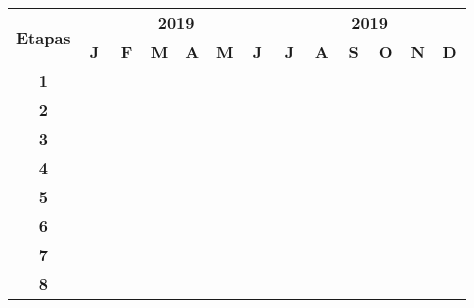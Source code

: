 \documentclass[11pt]{article}
\begin{document}
\begin{table}[h]
\centering
\begin{tabular}{|c||c|c|c|c|c|c|c|c|c|c|c|c||c|c|c|c|c|c|c|c|c|c|c|c|}
  \hline
  \multirow{2}{*}{\textbf{\small{Etapas}}} &
  \multicolumn{12}{|c||}{\textbf{\small{2019}}} &
  \multicolumn{12}{|c|}{\textbf{\small{2019}}} \\
  \cline{2-25}
   & \multicolumn{2}{|c|}{\textbf{J}} & \multicolumn{2}{|c|}{\textbf{F}} & \multicolumn{2}{|c|}{\textbf{M}} & \multicolumn{2}{|c|}{\textbf{A}} & \multicolumn{2}{|c|}{\textbf{M}} & \multicolumn{2}{|c||}{\textbf{J}} & \multicolumn{2}{|c|}{\textbf{J}} & \multicolumn{2}{|c|}{\textbf{A}} & \multicolumn{2}{|c|}{\textbf{S}} & \multicolumn{2}{|c|}{\textbf{O}} & \multicolumn{2}{|c|}{\textbf{N}} & \multicolumn{2}{|c|}{\textbf{D}}  \\
  \hline \hline
  \textbf{\small{1}} & & \cellcolor{black} & \cellcolor{black} & \cellcolor{black} & \cellcolor{black} & & & & & & & & & & & & & & & & & & & \\
  \hline
  \textbf{\small{2}} & & & \cellcolor{black} & \cellcolor{black} & \cellcolor{black} & \cellcolor{black} & & & & & & & & & & & & & & & & & & \\
  \hline
  \textbf{\small{3}} & & & & \cellcolor{black} & \cellcolor{black} & \cellcolor{black} & \cellcolor{black} & \cellcolor{black} & \cellcolor{black} & & & & & & & & & & & & & & & \\
  \hline
  \textbf{\small{4}} & & & & & & & & & & \cellcolor{black} & \cellcolor{black} & \cellcolor{black} & \cellcolor{black} & \cellcolor{black} & \cellcolor{black} & & & & & & & & & \\
  \hline
  \textbf{\small{5}} & & & & & & & & & & & & & & & \cellcolor{black} & \cellcolor{black} & \cellcolor{black} & \cellcolor{black} & & & & & & \\
  \hline
  \textbf{\small{6}} & & & & & & & & & & & & & & & & & \cellcolor{black} & \cellcolor{black} & \cellcolor{black} & \cellcolor{black} & & & & \\
  \hline
  \textbf{\small{7}} & & & & & & & & & & & & & & & & & & & \cellcolor{black} & \cellcolor{black} & \cellcolor{black} & & & \\
  \hline
  \textbf{\small{8}} & & \cellcolor{black} & \cellcolor{black} & \cellcolor{black} & \cellcolor{black} & \cellcolor{black} & \cellcolor{black} & \cellcolor{black} & \cellcolor{black} & \cellcolor{black} & \cellcolor{black} & \cellcolor{black} & \cellcolor{black} & \cellcolor{black} & \cellcolor{black} & \cellcolor{black} & \cellcolor{black} & \cellcolor{black} & \cellcolor{black} & \cellcolor{black} & \cellcolor{black} & \cellcolor{black} & \cellcolor{black} & \\
  \hline
\end{tabular}
\end{table}
\end{document}
